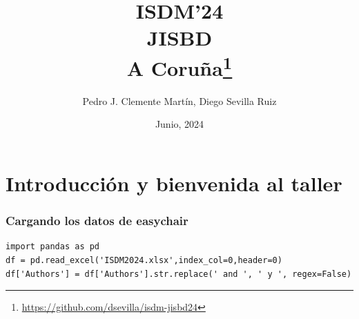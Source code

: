 
\usepackage{arydshln}


\title[ISDM'24, JISBD, A Coruña]{ISDM'24\\JISBD\\A Coruña\thanks{\url{https://github.com/dsevilla/isdm-jisbd24}}}

\author{Pedro J. Clemente Martín, Diego Sevilla Ruiz}
\date{Junio, 2024}



\def\insertsectionnumber{\arabic{section}}
\def\insertsubsectionnumber{\arabic{subsection}}



\begin{frame}
  \titlepage
\end{frame}

\section{Introducción y bienvenida al taller}



\begin{frame}[fragile]
\frametitle{Cargando los datos de easychair}

\begin{lstlisting}
import pandas as pd
df = pd.read_excel('ISDM2024.xlsx',index_col=0,header=0)
df['Authors'] = df['Authors'].str.replace(' and ', ' y ', regex=False)
\end{lstlisting}

\end{frame}

